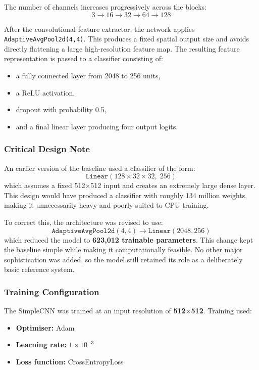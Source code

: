 \documentclass{article}
\begin{document}
The number of channels increases progressively across the blocks:
\[3 \rightarrow 16 \rightarrow 32 \rightarrow 64 \rightarrow 128\]

After the convolutional feature extractor, the network applies \texttt{AdaptiveAvgPool2d(4,4)}. This produces a fixed spatial output size and avoids directly flattening a large high-resolution feature map. The resulting feature representation is passed to a classifier consisting of:
\begin{itemize}
    \item a fully connected layer from 2048 to 256 units,
    \item a ReLU activation,
    \item dropout with probability 0.5,
    \item and a final linear layer producing four output logits.
\end{itemize}

\subsubsection{Critical Design Note}

An earlier version of the baseline used a classifier of the form:
\[\texttt{Linear}(128 \times 32 \times 32,\; 256)\]
which assumes a fixed 512$\times$512 input and creates an extremely large dense layer. This design would have produced a classifier with roughly 134 million weights, making it unnecessarily heavy and poorly suited to CPU training.

To correct this, the architecture was revised to use:
\[\texttt{AdaptiveAvgPool2d}(4,4) \rightarrow \texttt{Linear}(2048,256)\]
which reduced the model to \textbf{623,012 trainable parameters}. This change kept the baseline simple while making it computationally feasible. No other major sophistication was added, so the model still retained its role as a deliberately basic reference system.

\subsubsection{Training Configuration}

The SimpleCNN was trained at an input resolution of \textbf{512$\times$512}. Training used:
\begin{itemize}
    \item \textbf{Optimiser:} Adam
    \item \textbf{Learning rate:} $1\times 10^{-3}$
    \item \textbf{Loss function:} CrossEntropyLoss
\end{itemize}
\end{document}
